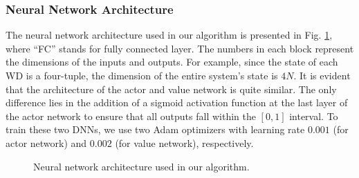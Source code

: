 \documentclass[lettersize, journal]{IEEEtran}
\begin{document}
\subsubsection{Neural Network Architecture}
The neural network architecture used in our algorithm is presented in Fig. \ref{fig:nna}, where ``FC'' stands for fully connected layer.
The numbers in each block represent the dimensions of the inputs and outputs.
For example, since the state of each WD is a four-tuple, the dimension of the entire system's state is $4N$.
It is evident that the architecture of the actor and value network is quite similar.
The only difference lies in the addition of a sigmoid activation function at the last layer of the actor network to ensure that all outputs fall within the $[0,1]$ interval.
To train these two DNNs, we use two Adam optimizers with learning rate $0.001$ (for actor network) and $0.002$ (for value network),
respectively.
\begin{figure}[h]
\centering
{}
\hfil
{}
\caption{Neural network architecture used in our algorithm.}
\label{fig:nna}
\end{figure}
\end{document}
